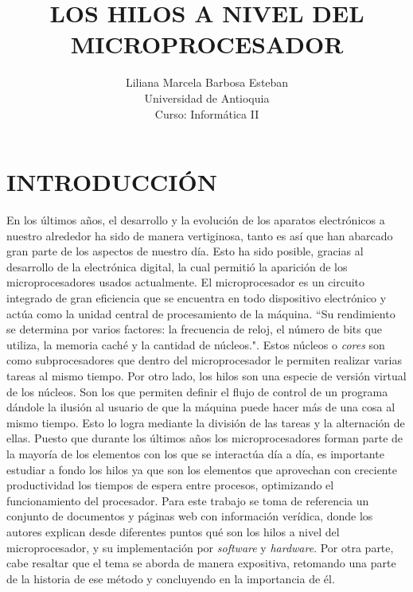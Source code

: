 \documentclass[12pt,letterpaper]{article}
\title{LOS HILOS A NIVEL DEL MICROPROCESADOR}
\author{Liliana Marcela Barbosa Esteban\\%
Universidad de Antioquia \\
Curso: Informática II
}
\date{}
\begin{document}
\maketitle
\thispagestyle{empty}
\pagestyle{empty}

\section{INTRODUCCIÓN}
En los últimos años, el desarrollo y la evolución de los aparatos electrónicos a nuestro alrededor ha sido de manera vertiginosa, tanto es así que han abarcado gran parte de los aspectos de nuestro día. Esto ha sido posible, gracias al desarrollo de la electrónica digital, la cual permitió la aparición de los microprocesadores usados actualmente.
\newline
\newline
El microprocesador es un circuito integrado de gran eficiencia que se encuentra en todo dispositivo electrónico y actúa como la unidad central de procesamiento de la máquina. ``Su rendimiento se determina por varios factores: la frecuencia de reloj, el número de bits que utiliza, la memoria caché y la cantidad de núcleos."\cite{c9}. Estos núcleos o \textit{cores} son como subprocesadores que dentro del microprocesador le permiten realizar varias tareas al mismo tiempo.
\newline
\newline
Por otro lado, los hilos son una especie de versión virtual de los núcleos. Son los que permiten definir el flujo de control de un programa dándole la ilusión al usuario de que la máquina puede hacer más de una cosa al mismo tiempo. Esto lo logra mediante la división de las tareas y la alternación de ellas.
\newline
\newline
Puesto que durante los últimos años los microprocesadores forman parte de la mayoría de los elementos con los que se interactúa día a día, es importante estudiar a fondo los hilos ya que son los elementos que aprovechan con creciente productividad los tiempos de espera entre procesos, optimizando el funcionamiento del procesador.
\newline
\newline
Para este trabajo se toma de referencia un conjunto de documentos y páginas web con información verídica, donde los autores explican desde diferentes puntos qué son los hilos a nivel del microprocesador, y su implementación por \textit{software} y \textit{hardware}. Por otra parte, cabe resaltar que el tema se aborda de manera expositiva, retomando una parte de la historia de ese método y concluyendo en la importancia de él.
\newline
\end{document}
